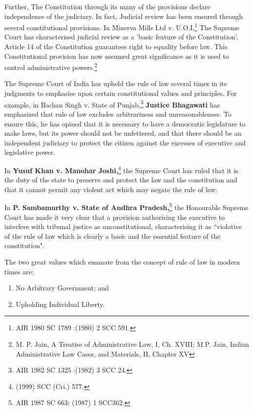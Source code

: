 \begin{multicols}{2}
\noi
Further, The Constitution through its many of the provisions declare independence of the
judiciary. In fact, Judicial review has been ensured through several constitutional provisions. In Minerva Mills Ltd v. U.O.I,\footnote{AIR 1980 SC 1789 :(1980) 2 SCC 591.}  The Supreme Court has characterised judicial review as a 'basic feature of the Constitution'. Article 14 of the Constitution guarantees right to equality before law. This Constitutional provision has now assumed great significance as it is used to control administrative powers.\footnote{M. P. Jain, A Treatise of Administrative Law, I, Ch. XVIII; M.P. Jain, Indian Administrative Law Cases, and Materials, II, Chapter XV}

\noi
The Supreme Court of India has upheld the rule of law several times in its judgments to emphasise
upon certain constitutional values and principles. For example, in Bachan Singh v. State of
Punjab,\footnote{AIR 1982 SC 1325 :(1982) 3 SCC 24.} \textbf{Justice Bhagawati} has emphasized that rule of law excludes arbitrariness and unreasonableness. To ensure this, he has opined that it is necessary to have a democratic legislature to make laws, but its power should not be unfettered, and that there should be an independent judiciary to protect the citizen against the excesses of executive and legislative power.

\noi
In \textbf{Yusuf Khan v. Manohar Joshi,}\footnote{(1999) SCC (Cri.) 577.} the Supreme Court has ruled that it is the duty of the state to preserve and protect the law and the constitution and that it cannot permit any violent act which may negate the rule of law.

\noi
In \textbf{P. Sambamurthy v. State of Andhra Pradesh,}\footnote{AIR 1987 SC 663: (1987) 1 SCC362.} the Honourable Supreme Court has made it very clear that a provision authorising the executive to interfere with tribunal justice as
unconstitutional, characterising it as “violative of the rule of law which is clearly a basic and the
essential feature of the constitution".

\noi
The two great values which emanate from the concept of rule of law in modern times are:

\vspace{-.3cm}

\begin{enumerate}
\itemsep=0pt

\item No Arbitrary Government; and

\item Upholding Individual Liberty.
\end{enumerate}


\end{multicols}
